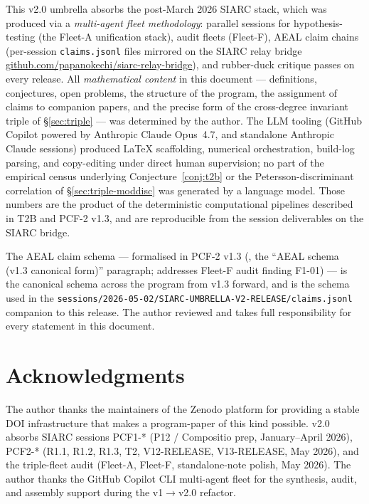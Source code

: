 \documentclass[11pt,a4paper]{article}
\theoremstyle{definition}
\theoremstyle{remark}
\begin{document}
This v2.0 umbrella absorbs the post-March 2026 SIARC stack, which was
produced via a \emph{multi-agent fleet methodology}: parallel sessions
for hypothesis-testing (the Fleet-A unification stack), audit fleets
(Fleet-F), AEAL claim chains (per-session
\texttt{claims.jsonl} files mirrored on the SIARC relay bridge
\href{https://github.com/papanokechi/siarc-relay-bridge}{github.com/papanokechi/siarc-relay-bridge}),
and rubber-duck critique passes on every release. All
\emph{mathematical content} in this document --- definitions,
conjectures, open problems, the structure of the program, the assignment
of claims to companion papers, and the precise form of the cross-degree
invariant triple of \S\ref{sec:triple} --- was determined by the author.
The LLM tooling (GitHub Copilot powered by Anthropic Claude Opus~4.7,
and standalone Anthropic Claude sessions) produced LaTeX scaffolding,
numerical orchestration, build-log parsing, and copy-editing under
direct human supervision; no part of the empirical census underlying
Conjecture~\ref{conj:t2b} or the Petersson-discriminant correlation of
\S\ref{sec:triple-moddisc} was generated by a language model. Those
numbers are the product of the deterministic computational pipelines
described in T2B and PCF-2 v1.3, and are reproducible from the session
deliverables on the SIARC bridge.

The AEAL claim schema --- formalised in PCF-2 v1.3 (\cite{PCF2}, the
``AEAL schema (v1.3 canonical form)'' paragraph; addresses Fleet-F
audit finding F1-01) --- is the canonical schema across the program
from v1.3 forward, and is the schema used in the
\texttt{sessions/2026-05-02/SIARC-UMBRELLA-V2-RELEASE/claims.jsonl}
companion to this release. The author reviewed and takes full
responsibility for every statement in this document.

\section*{Acknowledgments}
The author thanks the maintainers of the Zenodo platform for providing
a stable DOI infrastructure that makes a program-paper of this kind
possible. v2.0 absorbs SIARC sessions PCF1-* (P12 / Compositio prep,
January--April 2026), PCF2-* (R1.1, R1.2, R1.3, T2, V12-RELEASE,
V13-RELEASE, May 2026), and the triple-fleet audit
(Fleet-A, Fleet-F, standalone-note polish, May 2026). The author
thanks the GitHub Copilot CLI multi-agent fleet for the synthesis,
audit, and assembly support during the v1$\to$v2.0 refactor.
\end{document}

